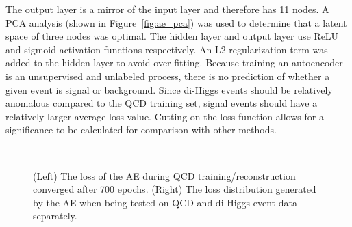 The output layer is a mirror of the input layer and therefore has 11 nodes. A PCA analysis (shown in Figure~\ref{fig:ae_pca}) was used to determine that a latent space of three nodes was optimal. The hidden layer and output layer use ReLU and sigmoid activation functions respectively. An L2 regularization term was added to the hidden layer to avoid over-fitting. %
Because training an autoencoder is an unsupervised and unlabeled process, there is no prediction of whether a given event is signal or background. Since di-Higgs events should be relatively anomalous compared to the QCD training set, signal events should have a relatively larger average loss value. Cutting on the loss function allows for a significance to be calculated for comparison with other methods.

\begin{figure}[!h] 
  \begin{center}
    \\
    \caption{(Left) The loss of the AE during QCD training/reconstruction converged after 700 epochs. (Right) The loss distribution generated by the AE when being tested on QCD and di-Higgs event data separately.}    
  \label{fig:ae_trainPredLoss}
\end{center}
\end{figure}

